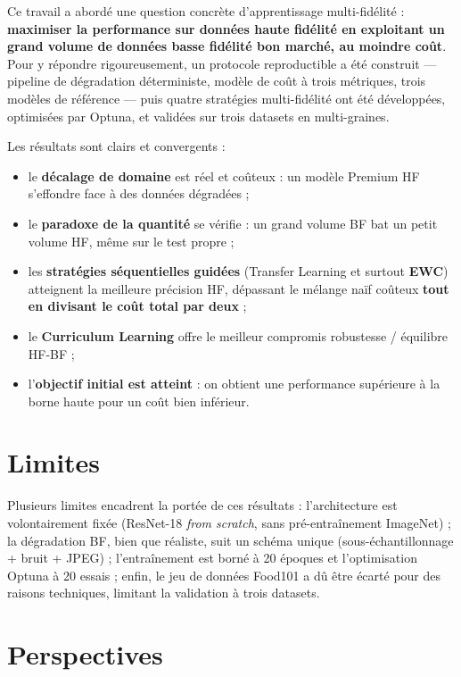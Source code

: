 \documentclass[11pt,a4paper,openany]{book}
\begin{document}
Ce travail a abordé une question concrète d'apprentissage multi-fidélité : \textbf{maximiser la performance sur données haute fidélité en exploitant un grand volume de données basse fidélité bon marché, au moindre coût}. Pour y répondre rigoureusement, un protocole reproductible a été construit — pipeline de dégradation déterministe, modèle de coût à trois métriques, trois modèles de référence — puis quatre stratégies multi-fidélité ont été développées, optimisées par Optuna, et validées sur trois datasets en multi-graines.

Les résultats sont clairs et convergents :

\begin{itemize}
  \item le \textbf{décalage de domaine} est réel et coûteux : un modèle Premium HF s'effondre face à des données dégradées ;
  \item le \textbf{paradoxe de la quantité} se vérifie : un grand volume BF bat un petit volume HF, même sur le test propre ;
  \item les \textbf{stratégies séquentielles guidées} (Transfer Learning et surtout \textbf{EWC}) atteignent la meilleure précision HF, dépassant le mélange naïf coûteux \textbf{tout en divisant le coût total par deux} ;
  \item le \textbf{Curriculum Learning} offre le meilleur compromis robustesse / équilibre HF-BF ;
  \item l'\textbf{objectif initial est atteint} : on obtient une performance supérieure à la borne haute pour un coût bien inférieur.
\end{itemize}

\section{Limites}

Plusieurs limites encadrent la portée de ces résultats : l'architecture est volontairement fixée (ResNet-18 \textit{from scratch}, sans pré-entraînement ImageNet) ; la dégradation BF, bien que réaliste, suit un schéma unique (sous-échantillonnage + bruit + JPEG) ; l'entraînement est borné à 20 époques et l'optimisation Optuna à 20 essais ; enfin, le jeu de données Food101 a dû être écarté pour des raisons techniques, limitant la validation à trois datasets.

\section{Perspectives}
\end{document}
